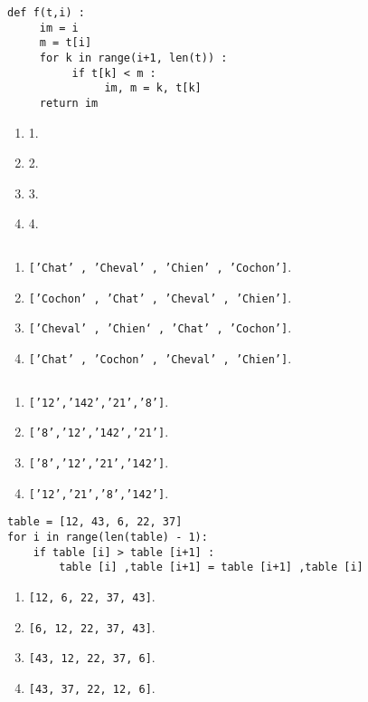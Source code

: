 \begin{lstlisting}
def f(t,i) :
     im = i
     m = t[i]
     for k in range(i+1, len(t)) :
          if t[k] < m :
               im, m = k, t[k]
     return im
\end{lstlisting}
\begin{enumerate}
\item 1.
\item 2. %
\item 3.
\item 4.
\end{enumerate}

\begin{lstlisting}
\end{lstlisting}
\begin{enumerate}
\item \texttt{['Chat' , 'Cheval' , 'Chien' , 'Cochon']}. %
\item \texttt{['Cochon' , 'Chat' , 'Cheval' , 'Chien']}.
\item \texttt{['Cheval' , 'Chien‘ , 'Chat' , 'Cochon']}.
\item \texttt{['Chat' , 'Cochon' , 'Cheval' , 'Chien']}.
\end{enumerate}

\begin{lstlisting}
\end{lstlisting}
\begin{enumerate}
\item \texttt{['12','142','21','8']}. %
\item \texttt{['8','12','142','21']}.
\item \texttt{['8','12','21','142']}.
\item \texttt{['12','21','8','142']}.
\end{enumerate}

\begin{lstlisting}
table = [12, 43, 6, 22, 37]
for i in range(len(table) - 1):
    if table [i] > table [i+1] :
        table [i] ,table [i+1] = table [i+1] ,table [i]
\end{lstlisting}
\begin{enumerate}
\item \texttt{[12, 6, 22, 37, 43]}.%
\item \texttt{[6, 12, 22, 37, 43]}.
\item \texttt{[43, 12, 22, 37, 6]}.
\item \texttt{[43, 37, 22, 12, 6]}.
\end{enumerate}

